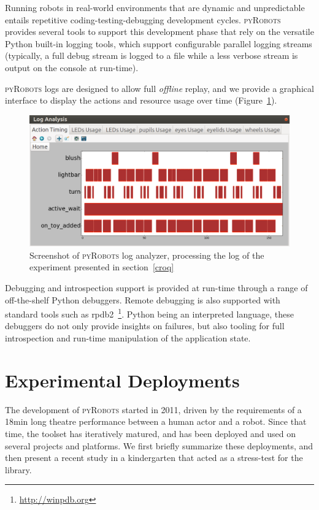 \documentclass[a4paper, 10pt, conference]{ieeeconf}      %
\newcommand{\pyRobots}{\textsc{pyRobots}}
\begin{document}
Running robots in real-world  environments that are dynamic and unpredictable
entails repetitive coding-testing-debugging development cycles. \pyRobots{}
provides several tools to support this development phase that rely on the
versatile Python built-in logging tools, which support configurable parallel
logging streams (typically, a full debug stream is logged to a file while a less
verbose stream is output on the console at run-time).

\pyRobots{} logs are designed to allow full \emph{offline} replay, and we
provide a graphical interface to display the actions and resource usage over
time (Figure~\ref{log_view}).

\begin{figure}
        \centering
        \includegraphics[width=0.9\columnwidth]{log}
        \caption{Screenshot of \pyRobots{} log analyzer, processing the log of the
        experiment presented in section~\ref{croq}}
        \label{log_view}
\end{figure}

Debugging and introspection support is provided at run-time through a range of
off-the-shelf Python debuggers. Remote debugging is also supported with standard
tools such as {\sc rpdb2}~\footnote{\url{http://winpdb.org}}. Python being an
interpreted language, these debuggers do not only provide insights on failures,
but also tooling for full introspection and run-time manipulation of the
application state.


\section{Experimental Deployments}

The development of \pyRobots{} started in 2011, driven by the requirements of a
18min long theatre performance between a human actor and a robot. Since that
time, the toolset has iteratively matured, and has been deployed and used on
several projects and platforms. We first briefly summarize these deployments,
and then present a recent study in a kindergarten that acted as a stress-test
for the library.
\end{document}
